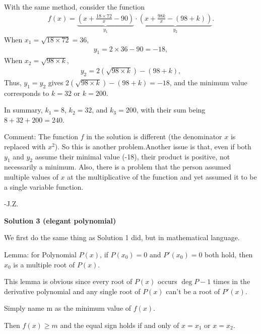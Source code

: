 \begin{enumerate}
 With the same method, consider the function\begin{align*}f(x) = \underbrace{\left( x + \frac{18 \times 72}{x} - 90 \right)}_{y_1} \cdot \underbrace{\left( x + \frac{98k}{x} - (98 + k) \right)}_{y_2}.\end{align*}
When \( x_1 = \sqrt{18 \times 72} = 36 \),\begin{align*}y_1 = 2\times 36 - 90 = -18,\end{align*}
When \( x_2 = \sqrt{98 \times k}\),\begin{align*}y_2 = 2(\sqrt{98 \times k})-(98+k),\end{align*}
Thus, \(y_1 = y_2 \) gives \( 2(\sqrt{98 \times k})-(98+k) = -18 \), and the minimum value corresponds to \( k = 32 \) or \( k = 200 \).

 In summary, \( k_1 = 8 \), \( k_2 = 32 \), and \( k_3 = 200 \), with their sum being$8+32+200=\boxed{240}$.

 Comment: The function $f$ in the solution is different (the denominator $x$ is replaced with $x^2$). So this is another problem.Another issue is that, even if both $y_1$ and $y_2$ assume their minimal value (-18), their product is positive, not necessarily a minimum. Also, there is a problem that the person assumed multiple values of $x$ at the multiplicative of the function and yet assumed it to be a single variable function.

 -J.Z.

 



\textbf{Solution 3 (elegant polynomial)}

We first do the same thing as Solution 1 did, but in mathematical language.

 Lemma: for Polynomial $P(x)$, if $P(x_0) = 0$ and $P'(x_0) = 0$ both hold, then $x_0$ is a multiple root of $P(x)$.

 This lemma is obvious since every root of $P(x)$ occurs $\deg P - 1$ times in the derivative polynomial and any single root of $P(x)$ can't be a root of $P'(x)$.

 Simply name m as the minimum value of $f(x)$.

 Then $f(x) \geq m$ and the equal sign holds if and only of $x=x_1$ or $x=x_2$.


\end{enumerate}

